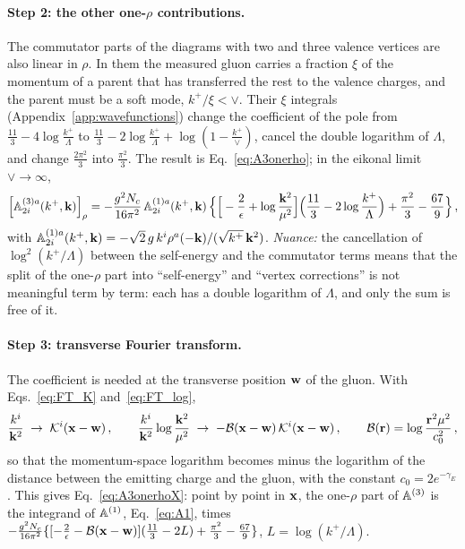 \paragraph{Step 2: the other one-$\rho$ contributions.} The commutator parts of the diagrams with two and three valence vertices are also linear in $\rho$. In them the measured gluon carries a fraction $\xi$ of the momentum of a parent that has transferred the rest to the valence charges, and the parent must be a soft mode, $k^+/\xi<\vee$. Their $\xi$ integrals (Appendix~\ref{app:wavefunctions}) change the coefficient of the pole from $\frac{11}{3}-4\log\frac{k^+}{\Lambda}$ to $\frac{11}{3}-2\log\frac{k^+}{\Lambda}+\log(1-\frac{k^+}{\vee})$, cancel the double logarithm of $\Lambda$, and change $\frac{2\pi^2}{3}$ into $\frac{\pi^2}{3}$. The result is Eq.~\eqref{eq:A3onerho}; in the eikonal limit $\vee\to\infty$,
\begin{align}\label{eq:ex1_A3}
\Big[\mathbb{A}^{(3)a}_{2i}(k^+,\mathbf{k})\Big]_\rho=-\frac{g^2N_c}{16\pi^2}\,\mathbb{A}^{(1)a}_{2i}(k^+,\mathbf{k})\,\Big\{\Big[-\frac2\epsilon+\log\frac{\mathbf{k}^2}{\mu^2}\Big]\Big(\frac{11}{3}-2\log\frac{k^+}{\Lambda}\Big)+\frac{\pi^2}{3}-\frac{67}{9}\Big\}\,,
\end{align}
with $\mathbb{A}^{(1)a}_{2i}(k^+,\mathbf{k})=-\sqrt2\,g\,k^i\rho^a(-\mathbf{k})/(\sqrt{k^+}\,\mathbf{k}^2)$. \emph{Nuance:} the cancellation of $\log^2(k^+/\Lambda)$ between the self-energy and the commutator terms means that the split of the one-$\rho$ part into ``self-energy'' and ``vertex corrections'' is not meaningful term by term: each has a double logarithm of $\Lambda$, and only the sum is free of it.

\paragraph{Step 3: transverse Fourier transform.} The coefficient is needed at the transverse position $\mathbf{w}$ of the gluon. With Eqs.~\eqref{eq:FT_K} and~\eqref{eq:FT_log},
\begin{align}
\frac{k^i}{\mathbf{k}^2}\;\to\;\mathcal{K}^i(\mathbf{x}-\mathbf{w})\,,\qquad\frac{k^i}{\mathbf{k}^2}\log\frac{\mathbf{k}^2}{\mu^2}\;\to\;-\mathcal B(\mathbf{x}-\mathbf{w})\,\mathcal{K}^i(\mathbf{x}-\mathbf{w})\,,\qquad\mathcal B(\mathbf{r})=\log\frac{\mathbf{r}^2\mu^2}{c_0^2}\,,
\end{align}
so that the momentum-space logarithm becomes minus the logarithm of the distance between the emitting charge and the gluon, with the constant $c_0=2e^{-\gamma_E}$. This gives Eq.~\eqref{eq:A3onerhoX}: point by point in $\mathbf{x}$, the one-$\rho$ part of $\mathbb{A}^{(3)}$ is the integrand of $\mathbb{A}^{(1)}$, Eq.~\eqref{eq:A1}, times $-\frac{g^2N_c}{16\pi^2}\{[-\frac2\epsilon-\mathcal B(\mathbf{x}-\mathbf{w})](\frac{11}{3}-2L)+\frac{\pi^2}{3}-\frac{67}{9}\}$, $L=\log(k^+/\Lambda)$.

